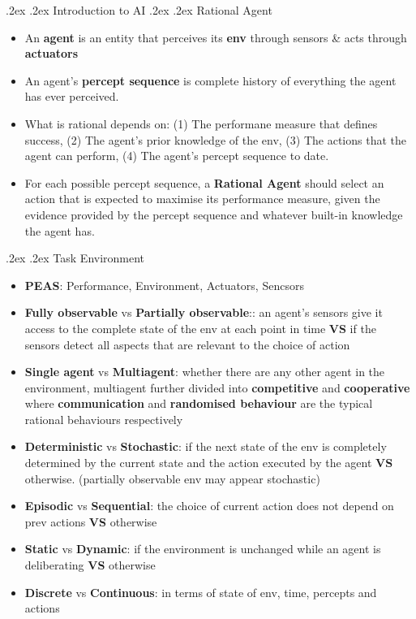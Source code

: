 \documentclass[11pt,landscape,a4paper]{article}
\makeatletter
\renewcommand{\section}{\@startsection{section}{1}{0mm}%
  {.2ex}%
  {.2ex}%
{\color{myblue}\sffamily\small\bfseries}}
\renewcommand{\subsection}{\@startsection{subsection}{1}{0mm}%
  {.2ex}%
  {.2ex}%
{\sffamily\bfseries}}
\makeatother
\begin{document}
\setlength{\abovedisplayskip}{0pt}
\setlength{\belowdisplayskip}{0pt}


\tiny
\begin{multicols*}{4}
  \raggedcolumns
  \section{Introduction to AI}
  \subsection{Rational Agent}
  \begin{itemize}
    \item An \textbf{agent} is an entity that perceives its \textbf{env} through sensors \& acts through \textbf{actuators}
    \item An agent's \textbf{percept sequence} is complete history of everything the agent has ever perceived.
    \item What is rational depends on: (1) The performane measure that defines success, (2) The agent's prior knowledge of the env, (3) The actions that the agent can perform, (4) The agent's percept sequence to date.
    \item For each possible percept sequence, a \textbf{Rational Agent} should select an action that is expected to maximise its performance measure, given the evidence provided by the percept sequence and whatever built-in knowledge the agent has.
  \end{itemize}
  \subsection{Task Environment}
  \begin{itemize}
    \item \textbf{PEAS}: Performance, Environment, Actuators, Sencsors
    \item \textbf{Fully observable} vs \textbf{Partially observable}:: an agent's sensors give it access to the complete state of the env at each point in time \textbf{VS} if the sensors detect all aspects that are relevant to the choice of action
    \item \textbf{Single agent} vs \textbf{Multiagent}: whether there are any other agent in the environment, multiagent further divided into \textbf{competitive} and \textbf{cooperative} where \textbf{communication} and \textbf{randomised behaviour} are the typical rational behaviours respectively
    \item \textbf{Deterministic} vs \textbf{Stochastic}: if the next state of the env is completely determined by the current state and the action executed by the agent \textbf{VS} otherwise. (partially observable env may appear stochastic)
    \item \textbf{Episodic} vs \textbf{Sequential}: the choice of current action does not depend on prev actions \textbf{VS} otherwise
    \item \textbf{Static} vs \textbf{Dynamic}: if the environment is unchanged while an agent is deliberating \textbf{VS} otherwise
    \item \textbf{Discrete} vs \textbf{Continuous}: in terms of state of env, time, percepts and actions
  \end{itemize}

\end{multicols*}
\end{document}
